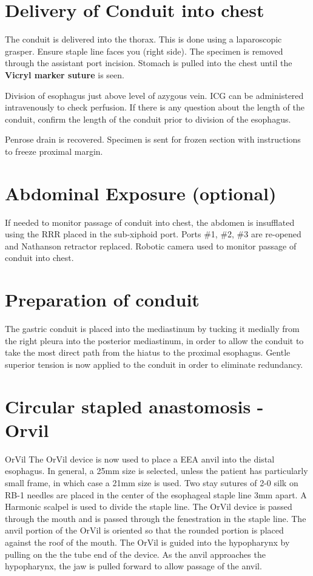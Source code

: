 \documentclass[
  letterpaper,
]{scrbook}
\begin{document}
\section{Delivery of Conduit into
chest}\label{delivery-of-conduit-into-chest-1}

The conduit is delivered into the thorax. This is done using a
laparoscopic grasper. Ensure staple line faces you (right side). The
specimen is removed through the assistant port incision. Stomach is
pulled into the chest until the \textbf{Vicryl marker suture} is seen.

Division of esophagus just above level of azygous vein. ICG can be
administered intravenously to check perfusion. If there is any question
about the length of the conduit, confirm the length of the conduit prior
to division of the esophagus.

Penrose drain is recovered. Specimen is sent for frozen section with
instructions to freeze proximal margin.

\section{Abdominal Exposure
(optional)}\label{abdominal-exposure-optional}

If needed to monitor passage of conduit into chest, the abdomen is
insufflated using the RRR placed in the sub-xiphoid port. Ports \#1,
\#2, \#3 are re-opened and Nathanson retractor replaced. Robotic camera
used to monitor passage of conduit into chest.

\section{Preparation of conduit}\label{preparation-of-conduit-3}

The gastric conduit is placed into the mediastinum by tucking it
medially from the right pleura into the posterior mediastinum, in order
to allow the conduit to take the most direct path from the hiatus to the
proximal esophagus. Gentle superior tension is now applied to the
conduit in order to eliminate redundancy.

\section{Circular stapled anastomosis -
Orvil}\label{circular-stapled-anastomosis---orvil-1}

OrVil The OrVil device is now used to place a EEA anvil into the distal
esophagus. In general, a 25mm size is selected, unless the patient has
particularly small frame, in which case a 21mm size is used. Two stay
sutures of 2-0 silk on RB-1 needles are placed in the center of the
esophageal staple line 3mm apart. A Harmonic scalpel is used to divide
the staple line. The OrVil device is passed through the mouth and is
passed through the fenestration in the staple line. The anvil portion of
the OrVil is oriented so that the rounded portion is placed against the
roof of the mouth. The OrVil is guided into the hypopharynx by pulling
on the the tube end of the device. As the anvil approaches the
hypopharynx, the jaw is pulled forward to allow passage of the anvil.
\end{document}
